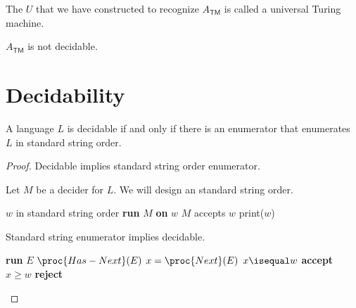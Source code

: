 The $U$ that we have constructed to recognize $A_{\mathsf{TM}}$ is called a universal Turing machine.

\begin{theorem}
    $A_{\mathsf{TM}}$ is not decidable.
\end{theorem}

\section{Decidability}

\begin{theorem}
    A language $L$ is decidable if and only if there is an enumerator that enumerates $L$ in standard string order.
\end{theorem}

\begin{proof}
    Decidable implies standard string order enumerator.

    Let $M$ be a decider for $L$. We will design an standard string order.

    \begin{codebox}
        \li \For $w$ in standard string order \Do
            \li \textbf{run} $M$ \textbf{on} $w$ 
            \li \If $M$ accepts $w$ \Then
                \li print($w$)
    \end{codebox}

    Standard string enumerator implies decidable.

    \begin{codebox}
        \li \textbf{run} $E$ 
        \li \While $\proc{Has-Next}(E)$ \Do {}
            \li $x = \proc{Next}(E)$ 
            \li \If $x \isequal w$ \Then
                \li \textbf{accept}
            \End
            \li \If $x \geq w$ \Then
                \li \textbf{reject}
    \end{codebox}
\end{proof}
